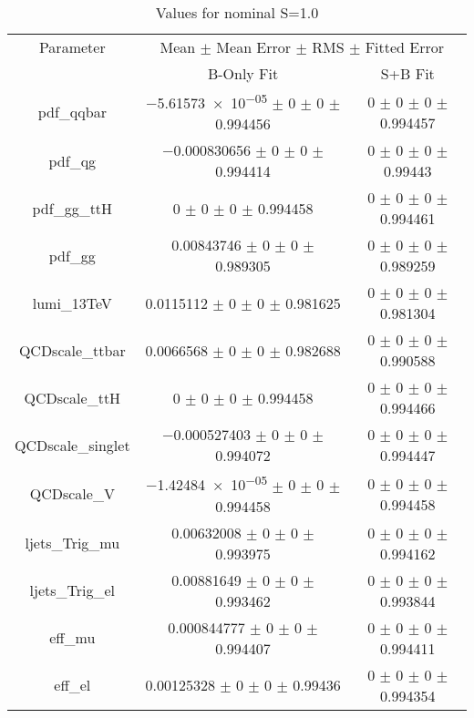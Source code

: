 \begin{table}
\centering
\caption{Values for nominal S=1.0}
\begin{tabular}{ccc}
\toprule
Parameter & \multicolumn{2}{c}{Mean $\pm$ Mean Error $\pm$ RMS $\pm$ Fitted Error}\\
 & B-Only Fit & S+B Fit\\
\midrule
pdf\_qqbar & \num{-5.61573e-05} $\pm$ \num{0} $\pm$ \num{0} $\pm$ \num{0.994456} & \num{0} $\pm$ \num{0} $\pm$ \num{0} $\pm$ \num{0.994457}\\
pdf\_qg & \num{-0.000830656} $\pm$ \num{0} $\pm$ \num{0} $\pm$ \num{0.994414} & \num{0} $\pm$ \num{0} $\pm$ \num{0} $\pm$ \num{0.99443}\\
pdf\_gg\_ttH & \num{0} $\pm$ \num{0} $\pm$ \num{0} $\pm$ \num{0.994458} & \num{0} $\pm$ \num{0} $\pm$ \num{0} $\pm$ \num{0.994461}\\
pdf\_gg & \num{0.00843746} $\pm$ \num{0} $\pm$ \num{0} $\pm$ \num{0.989305} & \num{0} $\pm$ \num{0} $\pm$ \num{0} $\pm$ \num{0.989259}\\
lumi\_13TeV & \num{0.0115112} $\pm$ \num{0} $\pm$ \num{0} $\pm$ \num{0.981625} & \num{0} $\pm$ \num{0} $\pm$ \num{0} $\pm$ \num{0.981304}\\
QCDscale\_ttbar & \num{0.0066568} $\pm$ \num{0} $\pm$ \num{0} $\pm$ \num{0.982688} & \num{0} $\pm$ \num{0} $\pm$ \num{0} $\pm$ \num{0.990588}\\
QCDscale\_ttH & \num{0} $\pm$ \num{0} $\pm$ \num{0} $\pm$ \num{0.994458} & \num{0} $\pm$ \num{0} $\pm$ \num{0} $\pm$ \num{0.994466}\\
QCDscale\_singlet & \num{-0.000527403} $\pm$ \num{0} $\pm$ \num{0} $\pm$ \num{0.994072} & \num{0} $\pm$ \num{0} $\pm$ \num{0} $\pm$ \num{0.994447}\\
QCDscale\_V & \num{-1.42484e-05} $\pm$ \num{0} $\pm$ \num{0} $\pm$ \num{0.994458} & \num{0} $\pm$ \num{0} $\pm$ \num{0} $\pm$ \num{0.994458}\\
ljets\_Trig\_mu & \num{0.00632008} $\pm$ \num{0} $\pm$ \num{0} $\pm$ \num{0.993975} & \num{0} $\pm$ \num{0} $\pm$ \num{0} $\pm$ \num{0.994162}\\
ljets\_Trig\_el & \num{0.00881649} $\pm$ \num{0} $\pm$ \num{0} $\pm$ \num{0.993462} & \num{0} $\pm$ \num{0} $\pm$ \num{0} $\pm$ \num{0.993844}\\
eff\_mu & \num{0.000844777} $\pm$ \num{0} $\pm$ \num{0} $\pm$ \num{0.994407} & \num{0} $\pm$ \num{0} $\pm$ \num{0} $\pm$ \num{0.994411}\\
eff\_el & \num{0.00125328} $\pm$ \num{0} $\pm$ \num{0} $\pm$ \num{0.99436} & \num{0} $\pm$ \num{0} $\pm$ \num{0} $\pm$ \num{0.994354}\\

\end{tabular}
\end{table}
